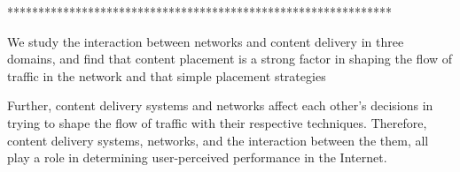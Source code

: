 





%

%




**************************************************************


 We study the interaction between networks and content delivery in three domains, and find that 
content placement is a strong factor in shaping the flow of  traffic in the network and that simple placement strategies 


 Further, content delivery systems and networks affect each other's decisions in trying to shape the flow of traffic with their respective techniques. Therefore, content delivery systems, networks, and the interaction between the them, all play a role in determining user-perceived performance in the Internet. 



